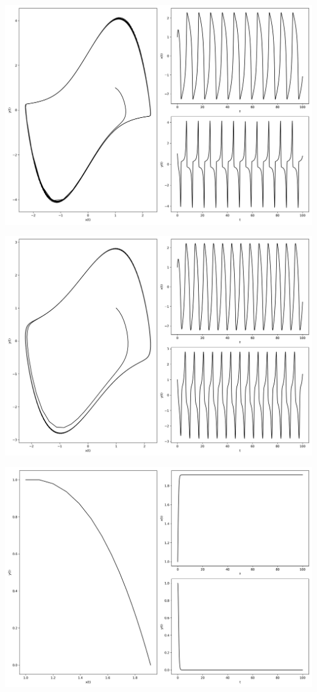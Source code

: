 \documentclass[12pt,a4paper]{jsarticle}
\makeatletter
\def\figcaption{\def\@captype{figure}\caption}
\makeatother
\begin{document}
\figcaption{$x_0=1,00, y_0=1.00, \mu=0.00, \omega=1.00, T = 100, N = 1000$}
\includegraphics[scale=0.33]{x1,0y1,0mu2,0omega1,0t1,00e+02n1,00e+03.png}
\figcaption{$x_0=1,00, y_0=1.00, \mu=2.00, \omega=1.00, T = 100, N = 1000$}
\includegraphics[scale=0.33]{x1,0y1,0mu1,0omega-1,0t1,00e+02n1,00e+03.png}
\figcaption{$x_0=1,00, y_0=1.00, \mu=1.00, \omega=-1.00, T = 100, N = 1000$}
\includegraphics[scale=0.33]{x1,0y1,0mu1,0omega0,0t1,00e+02n1,00e+03.png}
\end{document}
